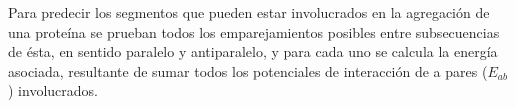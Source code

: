 Para predecir los segmentos que pueden estar involucrados en la agregación de una proteína
se prueban todos los emparejamientos posibles entre subsecuencias de ésta, en sentido paralelo y antiparalelo, y para cada uno 
se calcula la energía asociada, resultante de sumar todos los potenciales de interacción de a pares ($E_{ab}$) involucrados.


